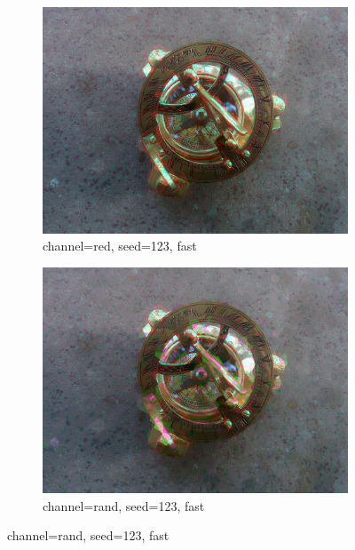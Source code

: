 \documentclass[15pt]{article}
\begin{document}
\begin{figure}
\begin{subfigure}[b]{0.48\linewidth}
\includegraphics[width=\linewidth]{r_f_seed123.jpg}
\caption{channel=red, seed=123, fast}
\end{subfigure}
\begin{subfigure}[b]{0.48\linewidth}
\includegraphics[width=\linewidth]{rand_f_seed123.jpg}
\caption{channel=rand, seed=123, fast}
\end{subfigure}
\end{figure}
\end{document}
